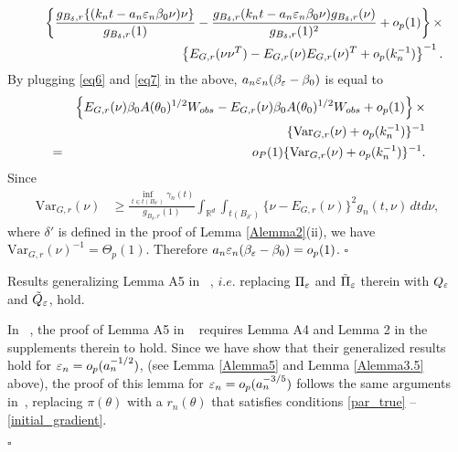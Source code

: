 	\begin{eqnarray*}
		&  & \left\{ \frac{g_{B_{\delta},r}\{(k_{n}t-a_{n}\veps_{n}\beta_{0}\nu)\nu\}}{g_{B_{\delta},r}(1)}-\frac{g_{B_{\delta},r}(k_{n}t-a_{n}\veps_{n}\beta_{0}\nu)g_{B_{\delta},r}(\nu)}{g_{B_{\delta},r}(1)^{2}}+o_{p}(1)\right\} \times\\
		&  & \qquad\left\{ E_{G,r}(\nu\nu^{T})-E_{G,r}(\nu)E_{G,r}(\nu)^{T}+o_{p}(k_{n}^{-1})\right\} ^{-1}.
	\end{eqnarray*}
	By plugging \eqref{eq6} and \eqref{eq7} in the above, $a_{n}\veps_{n}(\beta_{\veps}-\beta_{0})$
	is equal to 
	\begin{eqnarray*}
		&  & \left\{ E_{G,r}(\nu)\beta_{0}A(\theta_{0})^{1/2}W_{\rm obs}-E_{G,r}(\nu)\beta_{0}A(\theta_{0})^{1/2}W_{\rm obs}+o_{p}(1)\right\} \times \\
		&  & \hspace{1cm}
		\{\text{Var}_{G,r}(\nu)+o_{p}(k_{n}^{-1})\}^{-1}\\
		&=& o_{P}(1)\{\text{Var}_{G,r}(\nu)+o_{p}(k_{n}^{-1})\}^{-1}.
	\end{eqnarray*}
	Since
	\begin{align*}
	\text{Var}_{G,r}(\nu) & \geq\frac{\inf_{t\in t(B_{\delta'})}\gamma_{n}(t)}{g_{B_{\delta},r}(1)}\int_{\mathbb{R}^{d}}\int_{t(B_{\delta'})}\{\nu-E_{G,r}(\nu)\}^{2}g_{n}(t,\nu)\,dtd\nu,
	\end{align*}
	where $\delta'$ is defined in the proof of Lemma \ref{Alemma2}(ii),
	we have $\text{Var}_{G,r}(\nu)^{-1}=\Theta_{p}(1)$. Therefore $a_{n}\veps_{n}(\beta_{\veps}-\beta_{0})=o_{p}(1)$.
	\hfill{$\square$} 

\begin{lemma}\label{Alemma6} Results generalizing Lemma A5 in ~\cite{Li2017},
	$i.e.$ replacing $\Pi_{\veps}$ and $\tilde{\Pi}_{\veps}$ therein with
	$Q_{\veps}$ and $\tilde{Q}_{\veps}$, hold. \end{lemma} 
	In ~\cite{Li2017}, the proof of Lemma A5 in ~\cite{Li2017} requires Lemma A4 and Lemma 2 in the supplements therein to hold. Since we have show that their generalized results hold for $\veps_{n}=o_{p}(a_{n}^{-1/2})$, (see Lemma \ref{Alemma5} and Lemma \ref{Alemma3.5} above),
    the proof of this lemma for $\veps_{n}=o_{p}(a_{n}^{-3/5})$ follows the same arguments in~\cite{Li2017}, replacing $\pi(\theta)$ with a $r_n(\theta)$ that satisfies conditions \ref{par_true} -- \ref{initial_gradient}.

 	\hfill{$\square$} 

